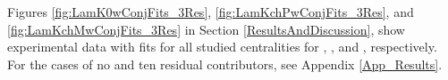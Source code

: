 \documentclass[/home/jesse/Analysis/FemtoAnalysis/AnalysisNotes/AnalysisNoteJBuxton.tex]{subfiles}
\begin{document}
Figures \ref{fig:LamK0wConjFits_3Res}, \ref{fig:LamKchPwConjFits_3Res}, and \ref{fig:LamKchMwConjFits_3Res} in Section \ref{ResultsAndDiscussion}, show experimental data with fits for all studied centralities for \LamKchPALamKchM, \LamKchMALamKchP, and \LamKsALamKs, respectively.
For the cases of no and ten residual contributors, see Appendix \ref{App_Results}.
\end{document}
